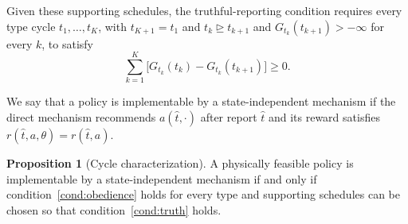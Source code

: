 \documentclass[12pt,reqno]{article}
\theoremstyle{definition} \newtheorem{example}{Example}
\theoremstyle{definition} \newtheorem{condition}{Condition}
\theoremstyle{definition} \newtheorem{corollary}{Corollary}
\theoremstyle{definition} \newtheorem{claim}{Claim}
\theoremstyle{definition} \newtheorem{definition}{Definition}
\theoremstyle{definition} \newtheorem{conjecture}{Conjecture}
\theoremstyle{definition} \newtheorem{Lemma}{Lemma}
\theoremstyle{definition} \newtheorem{lemma}{Lemma}
\theoremstyle{plain} \newtheorem{theorem}{Theorem}
\theoremstyle{definition} \newtheorem{assumption}{Assumption}
\theoremstyle{definition} \newtheorem*{assumptionnonumber}{Assumption}
\theoremstyle{definition} \newtheorem*{theoremNoNumber}{Proposition}
\theoremstyle{definition}\newtheorem{proposition}{Proposition}
\theoremstyle{definition} \newtheorem{observation}{Observation}
\theoremstyle{definition} \newtheorem*{definitionNoNumber}{Definition}
\theoremstyle{definition} \newtheorem{Definition}{Definition}
\theoremstyle{definition} \newtheorem*{DefinitionNoNumber}{Definition}
\theoremstyle{definition} \newtheorem*{fact}{Fact}
\theoremstyle{definition} \newtheorem*{property}{Property}
\theoremstyle{definition} \newtheorem{remark}{Remark}
\theoremstyle{definition}\newtheorem{romanexampleinner}{Example}
\begin{document}
Given these supporting schedules, the truthful-reporting condition requires every type cycle $t_1,\ldots,t_K$, with $t_{K+1}=t_1$ and {$t_k\trianglerighteq t_{k+1}$ and} $G_{t_k}(t_{k+1})>-\infty$ for every $k$, to satisfy
\begin{equation*}
\sum_{k=1}^K
\big[G_{t_k}(t_k)-G_{t_k}(t_{k+1})\big]
\geq0.
\tag{T} \label{cond:truth}
\end{equation*}

We say that a policy is implementable by a state-independent mechanism if
the direct mechanism recommends $a(\hat t,\cdot)$ after report $\hat t$
and its reward satisfies $r(\hat t,a,\theta)=r(\hat t,a)$.

\begin{proposition}[Cycle characterization]\label{prop:interim-cm}
A physically feasible policy is implementable by a state-independent mechanism if and only if condition~\eqref{cond:obedience} holds for every type and supporting schedules can be chosen so that condition~\eqref{cond:truth} holds. 
\end{proposition}
\end{document}
